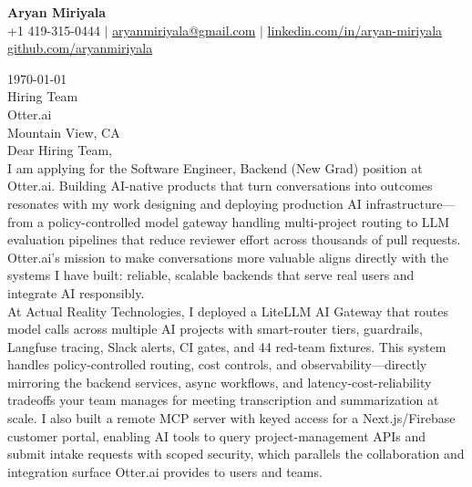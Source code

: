 \documentclass[letterpaper,11pt]{article}
\begin{document}
\begin{center}
  {\LARGE \textbf{Aryan Miriyala}}\\[2pt]
  \small
  +1 419-315-0444 $|$ \href{mailto:aryanmiriyala@gmail.com}{aryanmiriyala@gmail.com} $|$ \href{https://www.linkedin.com/in/aryan-miriyala-7788a21b6/}{linkedin.com/in/aryan-miriyala}\\
  \href{https://github.com/aryanmiriyala}{github.com/aryanmiriyala}
\end{center}\vspace{12pt}

\today\\[12pt]

Hiring Team\\
Otter.ai\\
Mountain View, CA\\[12pt]

Dear Hiring Team,\\[8pt]

I am applying for the Software Engineer, Backend (New Grad) position at Otter.ai. Building AI-native products that turn conversations into outcomes resonates with my work designing and deploying production AI infrastructure—from a policy-controlled model gateway handling multi-project routing to LLM evaluation pipelines that reduce reviewer effort across thousands of pull requests. Otter.ai's mission to make conversations more valuable aligns directly with the systems I have built: reliable, scalable backends that serve real users and integrate AI responsibly.\\[8pt]

At Actual Reality Technologies, I deployed a LiteLLM AI Gateway that routes model calls across multiple AI projects with smart-router tiers, guardrails, Langfuse tracing, Slack alerts, CI gates, and 44 red-team fixtures. This system handles policy-controlled routing, cost controls, and observability—directly mirroring the backend services, async workflows, and latency-cost-reliability tradeoffs your team manages for meeting transcription and summarization at scale. I also built a remote MCP server with keyed access for a Next.js/Firebase customer portal, enabling AI tools to query project-management APIs and submit intake requests with scoped security, which parallels the collaboration and integration surface Otter.ai provides to users and teams.\\[8pt]
\end{document}
